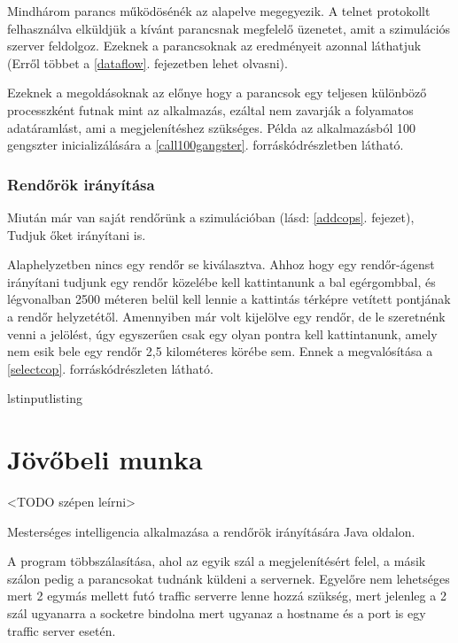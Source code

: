 \documentclass[a4paper,12pt]{report}
\begin{document}
Mindhárom parancs működösénék az alapelve megegyezik. A telnet protokollt felhasználva elküldjük a kívánt parancsnak megfelelő üzenetet, amit a szimulációs szerver feldolgoz. Ezeknek a parancsoknak az eredményeit azonnal láthatjuk (Erről többet a \ref{dataflow}. fejezetben lehet olvasni).

\vspace{2mm}
Ezeknek a megoldásoknak az előnye hogy a parancsok egy teljesen különböző processzként futnak mint az alkalmazás, ezáltal nem zavarják a folyamatos adatáramlást, ami a megjelenítéshez szükséges. Példa az alkalmazásból 100 gengszter inicializálására a \ref{call100gangster}. forráskódrészletben látható.



\subsection{Rendőrök irányítása}
\label{controlcops}

Miután már van saját rendőrünk a szimulációban (lásd: \ref{addcops}. fejezet), Tudjuk őket irányítani is.

\vspace{2mm}
Alaphelyzetben nincs egy rendőr se kiválasztva. Ahhoz hogy egy rendőr-ágenst irányítani tudjunk egy rendőr közelébe kell kattintanunk a bal egérgombbal, és légvonalban 2500 méteren belül kell lennie a kattintás térképre vetített pontjának a rendőr helyzetétől. Amennyiben már volt kijelölve egy rendőr, de le szeretnénk venni a jelölést, úgy egyszerűen csak egy olyan pontra kell kattintanunk, amely nem esik bele egy rendőr 2,5 kilométeres körébe sem. Ennek a megvalósítása a \ref{selectcop}. forráskódrészleten látható.

lstinputlisting

\newpage
\chapter{Jövőbeli munka}
\label{futureworks}

<TODO szépen leírni>

Mesterséges intelligencia alkalmazása a rendőrök irányítására Java oldalon. 

A program többszálasítása, ahol az egyik szál a megjelenítésért felel, a másik szálon pedig a parancsokat tudnánk küldeni a servernek. Egyelőre nem lehetséges mert 2 egymás mellett futó traffic serverre lenne hozzá szükség, mert jelenleg a 2 szál ugyanarra a socketre bindolna mert ugyanaz a hostname és a port is egy traffic server esetén. 
\end{document}
